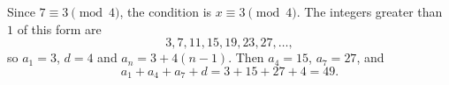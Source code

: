 Since $7\equiv3\pmod4$, the condition is $x\equiv3\pmod4$. The integers greater than $1$ of this form are
\[
3,7,11,15,19,23,27,\dots,
\]
so $a_1=3$, $d=4$ and $a_n=3+4(n-1)$. Then $a_4=15$, $a_7=27$, and
\[
a_1+a_4+a_7+d=3+15+27+4=\boxed{49}.
\]
